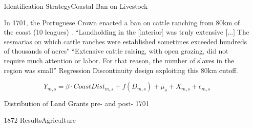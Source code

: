 \documentclass[aspectratio=1610]{beamer}
\begin{document}

\begin{frame}{Identification Strategy}{Coastal Ban on Livestock}
    \begin{outline}
        \1 In 1701, the Portuguese Crown enacted a ban on cattle ranching from 80km of the coast (10 leagues) \parencites[p~.40]{Fausto2014-bh}[p~.198]{Simonsen2005-ps}[p~.460]{Bethell1984-of}.
        \1 ``Landholding in the [interior] was truly extensive [...] The sesmarias on which cattle ranches were established sometimes exceeded hundreds of thousands of acres" \parencite{Bethell1984-of} 
        \1 ``Extensive cattle raising, with open grazing, did not require much attention or labor. For that reason, the number of slaves in the region was small'' \parencite[p.~113]{De_Oliveira_Andrade1980-xz}
        \1 Regression Discontinuity design exploiting this 80km cutoff.
    \end{outline}
    \vspace{2mm}
    
    \begin{equation}
    Y_{m,s} = \beta \cdot CoastDist_{m,s} + f(D_{m,s})+ \mu_s + X_{m,s} + \epsilon_{m,s}
    \end{equation}
\end{frame}

\begin{frame}{Distribution of Land Grants pre- and post- 1701}
    \begin{figure}
        \begin{center}
        \end{center}
        \label{fig:SesmariasDistribution}
      \end{figure}      
\end{frame}

\begin{frame}{1872 Results}{Agriculture}
    \begin{figure}
        \begin{center}
        \end{center}
      \end{figure}
\end{frame}
\end{document}
